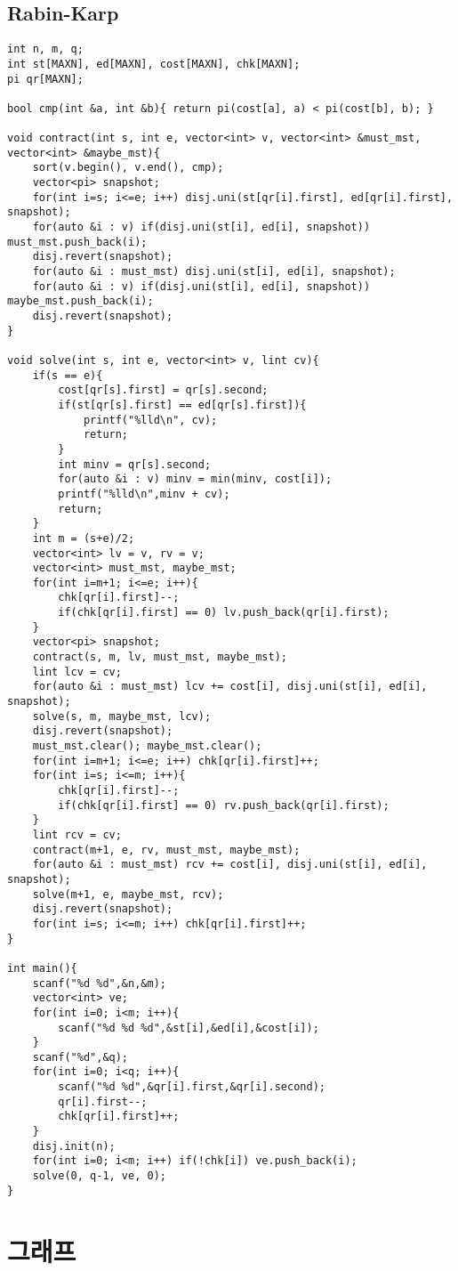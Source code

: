 \documentclass[landscape, 8pt, a4paper, oneside, twocolumn]{extarticle}
\begin{document}
\subsection{Rabin-Karp}
\begin{verbatim}
int n, m, q;
int st[MAXN], ed[MAXN], cost[MAXN], chk[MAXN];
pi qr[MAXN];

bool cmp(int &a, int &b){ return pi(cost[a], a) < pi(cost[b], b); }

void contract(int s, int e, vector<int> v, vector<int> &must_mst, vector<int> &maybe_mst){
	sort(v.begin(), v.end(), cmp);
	vector<pi> snapshot;
	for(int i=s; i<=e; i++) disj.uni(st[qr[i].first], ed[qr[i].first], snapshot);
	for(auto &i : v) if(disj.uni(st[i], ed[i], snapshot)) must_mst.push_back(i);
	disj.revert(snapshot);
	for(auto &i : must_mst) disj.uni(st[i], ed[i], snapshot);
	for(auto &i : v) if(disj.uni(st[i], ed[i], snapshot)) maybe_mst.push_back(i);
	disj.revert(snapshot);
}

void solve(int s, int e, vector<int> v, lint cv){
	if(s == e){
		cost[qr[s].first] = qr[s].second;
		if(st[qr[s].first] == ed[qr[s].first]){
			printf("%lld\n", cv);
			return;
		}
		int minv = qr[s].second;
		for(auto &i : v) minv = min(minv, cost[i]);
		printf("%lld\n",minv + cv);
		return;
	}
	int m = (s+e)/2;
	vector<int> lv = v, rv = v;
	vector<int> must_mst, maybe_mst;
	for(int i=m+1; i<=e; i++){
		chk[qr[i].first]--;
		if(chk[qr[i].first] == 0) lv.push_back(qr[i].first);
	}
	vector<pi> snapshot;
	contract(s, m, lv, must_mst, maybe_mst);
	lint lcv = cv;
	for(auto &i : must_mst) lcv += cost[i], disj.uni(st[i], ed[i], snapshot);
	solve(s, m, maybe_mst, lcv);
	disj.revert(snapshot);
	must_mst.clear(); maybe_mst.clear();
	for(int i=m+1; i<=e; i++) chk[qr[i].first]++;
	for(int i=s; i<=m; i++){
		chk[qr[i].first]--;
		if(chk[qr[i].first] == 0) rv.push_back(qr[i].first);
	}
	lint rcv = cv;
	contract(m+1, e, rv, must_mst, maybe_mst);
	for(auto &i : must_mst) rcv += cost[i], disj.uni(st[i], ed[i], snapshot);
	solve(m+1, e, maybe_mst, rcv);
	disj.revert(snapshot);
	for(int i=s; i<=m; i++) chk[qr[i].first]++;
}

int main(){
	scanf("%d %d",&n,&m);
	vector<int> ve;
	for(int i=0; i<m; i++){
		scanf("%d %d %d",&st[i],&ed[i],&cost[i]);
	}
	scanf("%d",&q);
	for(int i=0; i<q; i++){
		scanf("%d %d",&qr[i].first,&qr[i].second);
		qr[i].first--;
		chk[qr[i].first]++;
	}
	disj.init(n);
	for(int i=0; i<m; i++) if(!chk[i]) ve.push_back(i);
	solve(0, q-1, ve, 0);
}
\end{verbatim}
\section{그래프}
\end{document}
